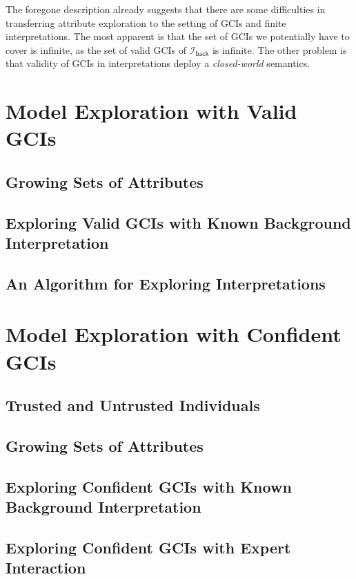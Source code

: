 The foregone description already suggests that there are some difficulties in transferring
attribute exploration to the setting of GCIs and finite interpretations.  The most
apparent is that the set of GCIs we potentially have to cover is infinite, as the set of
valid GCIs of $\mathcal{I}_{\mathsf{back}}$ is infinite.  The other problem is that
validity of GCIs in interpretations deploy a \emph{closed-world} semantics.

\section{Model Exploration with Valid GCIs}
\label{sec:model-expl-with}


\subsection{Growing Sets of Attributes}
\label{sec:grow-sets-attr}

\subsection{Exploring Valid GCIs with Known Background Interpretation}
\label{sec:comp-bases-given}

\subsection{An Algorithm for Exploring Interpretations}
\label{sec:an-algor-expl}

\section{Model Exploration with Confident GCIs}
\label{sec:model-expl-with-1}

%

\subsection{Trusted and Untrusted Individuals}
\label{sec:trust-untr-indiv}

\subsection{Growing Sets of Attributes}
\label{sec:grow-sets-attr-1}

\subsection{Exploring Confident GCIs with Known Background Interpretation}
\label{sec:expl-conf-gcis}

\subsection{Exploring Confident GCIs with Expert Interaction}
\label{sec:expl-conf-gcis-1}

